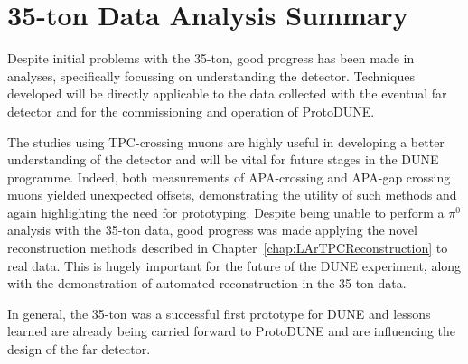 \section{35-ton Data Analysis Summary}\label{sec:35tonDataSummary}

Despite initial problems with the 35-ton, good progress has been made in analyses, specifically focussing on understanding the detector.  Techniques developed will be directly applicable to the data collected with the eventual far detector and for the commissioning and operation of ProtoDUNE.

The studies using TPC-crossing muons are highly useful in developing a better understanding of the detector and will be vital for future stages in the DUNE programme.  Indeed, both measurements of APA-crossing and APA-gap crossing muons yielded unexpected offsets, demonstrating the utility of such methods and again highlighting the need for prototyping.  Despite being unable to perform a $\pi^0$ analysis with the 35-ton data, good progress was made applying the novel reconstruction methods described in Chapter~\ref{chap:LArTPCReconstruction} to real data.  This is hugely important for the future of the DUNE experiment, along with the demonstration of automated reconstruction in the 35-ton data.

In general, the 35-ton was a successful first prototype for DUNE and lessons learned are already being carried forward to ProtoDUNE and are influencing the design of the far detector.
